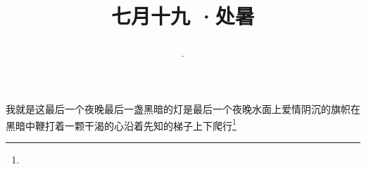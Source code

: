 \title{\date[d=22,m=8,y=2024][year:cn-y,年,month:cn,day:cn,日,·,weekday]·七月十九 ·处暑}
我就是这最后一个夜晚最后一盏黑暗的灯是最后一个夜晚水面上爱情阴沉的旗帜在黑暗中鞭打着一颗干渴的心沿着先知的梯子上下爬行\footnote{ }

